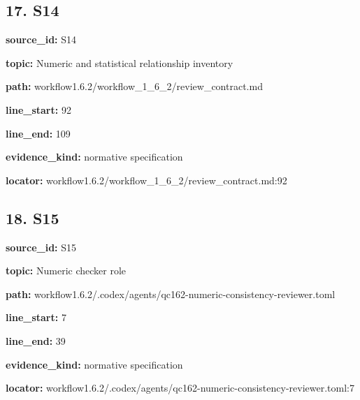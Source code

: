 \documentclass[10pt,a4paper]{article}
\begin{document}
\subsection*{17.\allowbreak{} S14}
\textbf{source\_\allowbreak{}id:} S14\par
\textbf{topic:} Numeric and statistical relationship inventory\par
\textbf{path:} workflow1.\allowbreak{}6.\allowbreak{}2/\allowbreak{}workflow\_\allowbreak{}1\_\allowbreak{}6\_\allowbreak{}2/\allowbreak{}review\_\allowbreak{}contract.\allowbreak{}md\par
\textbf{line\_\allowbreak{}start:} 92\par
\textbf{line\_\allowbreak{}end:} 109\par
\textbf{evidence\_\allowbreak{}kind:} normative specification\par
\textbf{locator:} workflow1.\allowbreak{}6.\allowbreak{}2/\allowbreak{}workflow\_\allowbreak{}1\_\allowbreak{}6\_\allowbreak{}2/\allowbreak{}review\_\allowbreak{}contract.\allowbreak{}md:92\par
\subsection*{18.\allowbreak{} S15}
\textbf{source\_\allowbreak{}id:} S15\par
\textbf{topic:} Numeric checker role\par
\textbf{path:} workflow1.\allowbreak{}6.\allowbreak{}2/\allowbreak{}.\allowbreak{}codex/\allowbreak{}agents/\allowbreak{}qc162-\allowbreak{}numeric-\allowbreak{}consistency-\allowbreak{}reviewer.\allowbreak{}toml\par
\textbf{line\_\allowbreak{}start:} 7\par
\textbf{line\_\allowbreak{}end:} 39\par
\textbf{evidence\_\allowbreak{}kind:} normative specification\par
\textbf{locator:} workflow1.\allowbreak{}6.\allowbreak{}2/\allowbreak{}.\allowbreak{}codex/\allowbreak{}agents/\allowbreak{}qc162-\allowbreak{}numeric-\allowbreak{}consistency-\allowbreak{}reviewer.\allowbreak{}toml:7\par
\end{document}
